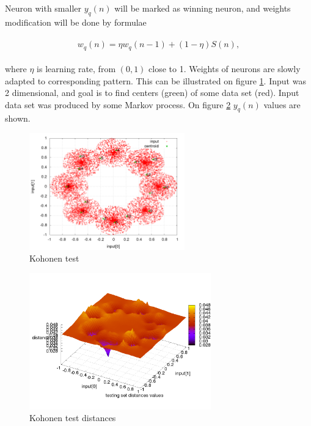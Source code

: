 \documentclass[twoside]{oss-conf-eng}
\begin{document}
Neuron with smaller $y_q(n)$ will be marked as winning neuron, and weights modification
will be done by formulae

\begin{eqnarray}
\begin{split}
\label{neuron_transfer}
w_q(n) = \eta w_q(n-1) + (1 - \eta)S(n),
\end{split}
\end{eqnarray}

where $\eta$ is learning rate, from $(0, 1)$ close to 1. Weights of neurons are slowly adapted
to corresponding pattern. This can be illustrated on figure \ref{fig:kohonen_test_01}. Input was
2 dimensional, and goal is to find centers (green) of some data set (red). Input
data set was produced by some Markov process. On figure \ref{fig:kohonen_test_02} $y_q(n)$ values are shown.

\begin{figure}[]
    \centering
    \includegraphics[width=0.6\textwidth]{kohonen_test/learing_result.png}
    \caption{Kohonen test}
    \label{fig:kohonen_test_01}
\end{figure}

\begin{figure}[]
    \centering
    \includegraphics[width=0.7\textwidth]{kohonen_test/distances_result.png}
    \caption{Kohonen test distances}
    \label{fig:kohonen_test_02}
\end{figure}
\end{document}
